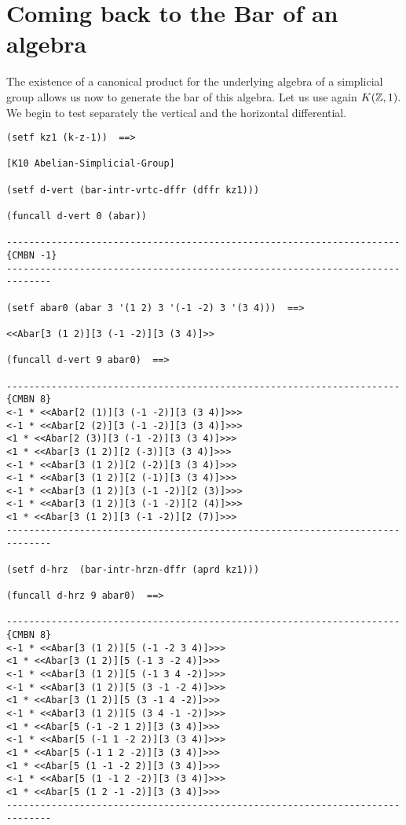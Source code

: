 \section {Coming back to the Bar of an algebra}

The existence of a canonical product for the underlying algebra of a simplicial group
allows us now to generate the bar of this algebra. Let us use again $K({{\Bbb Z}}, 1).$
We begin to test separately the vertical and the horizontal differential.
{\footnotesize\begin{verbatim}
(setf kz1 (k-z-1))  ==>

[K10 Abelian-Simplicial-Group]

(setf d-vert (bar-intr-vrtc-dffr (dffr kz1)))

(funcall d-vert 0 (abar))

----------------------------------------------------------------------{CMBN -1}
------------------------------------------------------------------------------

(setf abar0 (abar 3 '(1 2) 3 '(-1 -2) 3 '(3 4)))  ==>

<<Abar[3 (1 2)][3 (-1 -2)][3 (3 4)]>>

(funcall d-vert 9 abar0)  ==>

----------------------------------------------------------------------{CMBN 8}
<-1 * <<Abar[2 (1)][3 (-1 -2)][3 (3 4)]>>>
<-1 * <<Abar[2 (2)][3 (-1 -2)][3 (3 4)]>>>
<1 * <<Abar[2 (3)][3 (-1 -2)][3 (3 4)]>>>
<1 * <<Abar[3 (1 2)][2 (-3)][3 (3 4)]>>>
<-1 * <<Abar[3 (1 2)][2 (-2)][3 (3 4)]>>>
<-1 * <<Abar[3 (1 2)][2 (-1)][3 (3 4)]>>>
<-1 * <<Abar[3 (1 2)][3 (-1 -2)][2 (3)]>>>
<-1 * <<Abar[3 (1 2)][3 (-1 -2)][2 (4)]>>>
<1 * <<Abar[3 (1 2)][3 (-1 -2)][2 (7)]>>>
------------------------------------------------------------------------------

(setf d-hrz  (bar-intr-hrzn-dffr (aprd kz1)))

(funcall d-hrz 9 abar0)  ==>

----------------------------------------------------------------------{CMBN 8}
<-1 * <<Abar[3 (1 2)][5 (-1 -2 3 4)]>>>
<1 * <<Abar[3 (1 2)][5 (-1 3 -2 4)]>>>
<-1 * <<Abar[3 (1 2)][5 (-1 3 4 -2)]>>>
<-1 * <<Abar[3 (1 2)][5 (3 -1 -2 4)]>>>
<1 * <<Abar[3 (1 2)][5 (3 -1 4 -2)]>>>
<-1 * <<Abar[3 (1 2)][5 (3 4 -1 -2)]>>>
<1 * <<Abar[5 (-1 -2 1 2)][3 (3 4)]>>>
<-1 * <<Abar[5 (-1 1 -2 2)][3 (3 4)]>>>
<1 * <<Abar[5 (-1 1 2 -2)][3 (3 4)]>>>
<1 * <<Abar[5 (1 -1 -2 2)][3 (3 4)]>>>
<-1 * <<Abar[5 (1 -1 2 -2)][3 (3 4)]>>>
<1 * <<Abar[5 (1 2 -1 -2)][3 (3 4)]>>>
------------------------------------------------------------------------------
\end{verbatim}}
